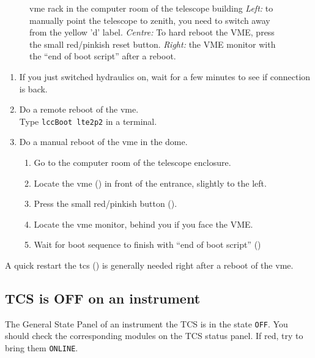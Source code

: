 \documentclass[11pt,fleqn,a4paper]{book}
\begin{document}
\begin{figure}
\centering
{}%
\caption[VME rack in the computer room of the telescope building]{\gls{vme} rack in the \gls{computer room} of the telescope building 
\emph{Left:} to
manually point the telescope to zenith, you need to switch away from 
the yellow 'd' label. \emph{Centre:} To hard reboot the VME, press the small red/pinkish reset button. \emph{Right:} the VME monitor with the ``end of boot script'' after a reboot.}
\end{figure}

\begin{enumerate}
    \item If you just switched hydraulics on, wait for a few minutes to see
        if connection is back.
    \item Do a remote reboot of the \gls{vme}.\\
          Type \texttt{\gls{lccBoot} \gls{lte2p2}} in a terminal.
    \item Do a manual reboot of the \gls{vme} in the dome.
    \begin{enumerate}
        \item Go to the \gls{computer room} of the telescope enclosure.
        \item Locate the \gls{vme} () in front of the entrance, slightly to the left.
        \item Press the small red/pinkish button ().
        \item Locate the \gls{vme} monitor, behind you if you face the VME.
        \item Wait for boot sequence to finish with ``end of boot script'' ()
    \end{enumerate}
\end{enumerate}

A quick restart the \gls{tcs} () is generally needed right after a reboot of the \gls{vme}.

\subsection{TCS is OFF on an instrument}
The \gls{General State} Panel of an instrument the TCS is in the state \texttt{OFF}. You should check the corresponding modules on the \gls{TCS status panel}.  If red, try to bring them \texttt{ONLINE}.
\end{document}
